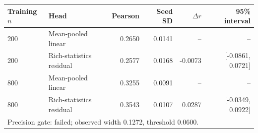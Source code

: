 \begin{tabular}{llrrrr}
\toprule
Training $n$ & Head & Pearson & Seed SD & $\Delta r$ & 95\% interval \\
\midrule
200 & Mean-pooled linear & 0.2650 & 0.0141 & -- & -- \\
200 & Rich-statistics residual & 0.2577 & 0.0168 & -0.0073 & [-0.0861, 0.0721] \\
800 & Mean-pooled linear & 0.3255 & 0.0091 & -- & -- \\
800 & Rich-statistics residual & 0.3543 & 0.0107 & 0.0287 & [-0.0349, 0.0922] \\
\midrule
\multicolumn{6}{l}{Precision gate: failed; observed width 0.1272, threshold 0.0600.} \\
\bottomrule
\end{tabular}
